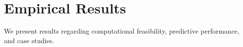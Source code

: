 \documentclass[conference]{IEEEtran}
\begin{document}
						
						
						
						\section{Empirical Results}
						
						We present results regarding computational feasibility, 
						predictive performance, and case studies.
						
\end{document}
